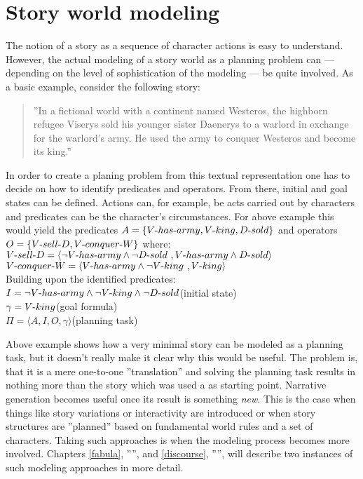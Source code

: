 \section{Story world modeling}\label{modeling}
The notion of a story as a sequence of character actions is easy to understand. However, the actual modeling of a story world as a planning problem can --- depending on the level of sophistication of the modeling --- be quite involved. As a basic example, consider the following story:
\begin{quote}
''In a fictional world with a continent named Westeros, the highborn refugee Viserys sold his younger sister Daenerys to a warlord in exchange for the warlord's army. He used the army to conquer Westeros and become its king.''
\end{quote}
In order to create a planing problem from this textual representation one has to decide on how to identify predicates and operators. From there, initial and goal states can be defined. Actions can, for example, be acts carried out by characters and predicates can be the character's circumstances. For above example this would yield the predicates $A=\{V\text{-} has\text{-} army,V\text{-} king,D\text{-} sold\}$ and operators $O=\{V\text{-} sell\text{-} D,V\text{-} conquer\text{-} W\}$ where:\\
$V\text{-} sell\text{-} D=\langle\neg V\text{-} has\text{-} army\land\neg D\text{-} sold\ ,V\text{-} has\text{-} army\land D\text{-} sold\rangle$\\
$V\text{-} conquer\text{-} W=\langle V\text{-} has\text{-} army\land\neg V\text{-} king\ ,V\text{-} king\rangle$\\
Building upon the identified predicates:\\
$I=\neg V\text{-} has\text{-} army\land\neg V\text{-} king\land\neg D\text{-} sold$\hphantom{tabtabtb}(initial state)\\
$\gamma= V\text{-} king$\hphantom{tabtabtabtabtabtabtabtabtabtaataatl}(goal formula)\\
$\Pi=\langle A,I,O,\gamma\rangle$\hphantom{tabtabtabtabtabtabtabtabtabtabl}(planning task)

Above example shows how a very minimal story can be modeled as a planning task, but it doesn't really make it clear why this would be useful. The problem is, that it is a mere one-to-one ''translation'' and solving the planning task results in nothing more than the story which was used a as starting point. Narrative generation becomes useful once its result is something \emph{new}. This is the case when things like story variations or interactivity are introduced or when story structures are ''planned'' based on fundamental world rules and a set of characters. Taking such approaches is when the modeling process becomes more involved. Chapters \ref{fabula}, '''', and \ref{discourse}, '''', will describe two instances of such modeling approaches in more detail.

